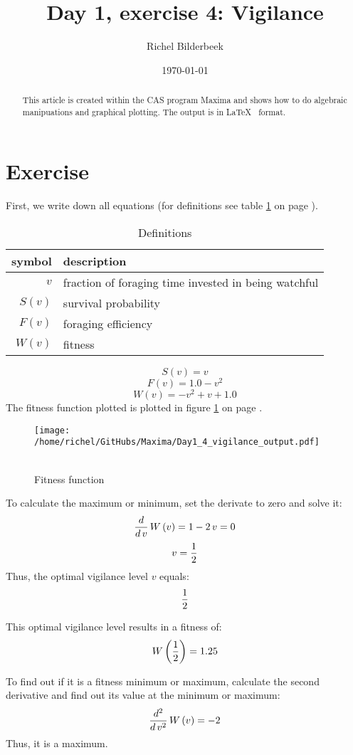 \documentclass{article}
\title{Day 1, exercise 4: Vigilance}
\author{Richel Bilderbeek}
\date{\today}
\begin{document}
\maketitle

\begin{abstract}
This article is created within the CAS program Maxima
and shows how to do algebraic manipuations and graphical plotting.
The output is in \LaTeX~ format.
\end{abstract}
\section{Exercise}
First, we write down all equations
(for definitions see table \ref{table:table_definition} on page \pageref{table:table_definition}).
\begin{table}[here]
  \centering
  \begin{tabular}{ | r | l | }
    \hline
    symbol & description \\
    \hline
    $v$ & fraction of foraging time invested in being watchful \\
    $S(v)$ & survival probability \\
    $F(v)$ & foraging efficiency \\
    $W(v)$ & fitness \\
    \hline
  \end{tabular}
  \caption{Definitions}
  \label{table:table_definition}
\end{table}
$$S\left(v\right)=v$$
$$F\left(v\right)=1.0-v^2$$
$$W\left(v\right)=-v^2+v+1.0$$
The fitness function plotted is plotted in figure 
\ref{figure:figure_fitness} on page \pageref{figure:figure_fitness}.\\
\begin{figure}[here]
\texttt{[image: /home/richel/GitHubs/Maxima/Day1\_4\_vigilance\_output.pdf]}\\\\
  \caption{Fitness function}
  \label{figure:figure_fitness}
\end{figure}
To calculate the maximum or minimum, set the derivate to zero and solve it:
$${{d}\over{d\,v}}\,W\left(v\right)=1-2\,v=0$$
$$v={{1}\over{2}}$$
Thus, the optimal vigilance level $v$ equals:$${{1}\over{2}}$$

This optimal vigilance level results in a fitness of:$$W\left({{1}\over{2}}\right)=1.25$$

To find out if it is a fitness minimum or maximum,
calculate the second derivative
and find out its value at the minimum or maximum:
$${{d^2}\over{d\,v^2}}\,W\left(v\right)=-2$$
Thus, it is a maximum.
\end{document}
